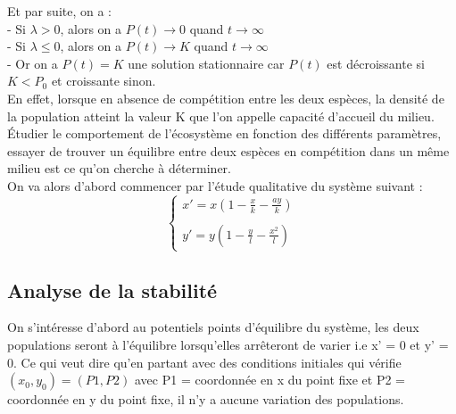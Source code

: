 \documentclass{article}
\begin{document}
Et par suite, on a :\\
- Si $\lambda > 0$, alors on a $P(t) \longrightarrow 0$ quand $t \longrightarrow \infty$\\
- Si $\lambda \leqslant 0$, alors on a $P(t) \longrightarrow K$ quand $t \longrightarrow \infty$\\
- Or on a $P(t) = K$ une solution stationnaire car $P(t)$ est décroissante si $K < P_0$ et croissante sinon.\\

En effet, lorsque en absence de compétition entre les deux espèces, la densité de la population atteint la valeur K que l'on appelle capacité d'accueil du milieu.\\

Étudier le comportement de l'écosystème en fonction des différents paramètres, essayer de trouver un équilibre entre deux espèces en compétition dans un même milieu est ce qu'on cherche à déterminer.\\
On va alors d'abord commencer par l'étude qualitative du système suivant :
\begin{equation}
\tag{S}
\left\{
\begin{array}{cc}
   x' =  x(1 - \frac{x}{k} - \frac{a y}{k}) \\\\
   y' = y(1- \frac{y}{l} - \frac{x^{2}}{l})
\end{array}
\right.
\end{equation}

\newpage

\subsection{Analyse de la stabilité}
On s'intéresse d'abord au potentiels points d'équilibre du système, les deux populations seront à l'équilibre lorsqu'elles arrêteront de varier i.e x' = 0 et y' = 0. Ce qui veut dire qu'en partant avec des conditions initiales qui vérifie $(x_{0},y_{0}) = (P1, P2)$
avec P1 = coordonnée en x du point fixe et P2 = coordonnée en y du point fixe, il n'y a aucune variation des populations.
\end{document}
